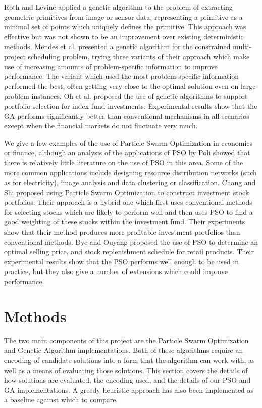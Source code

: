 \documentclass{sig-alternate}
\begin{document}
Roth and Levine applied a genetic algorithm to the problem of extracting geometric primitives from image or sensor data\cite{Roth1994}, representing a primitive as a minimal set of points which uniquely defines the primitive. This approach was effective but was not shown to be an improvement over existing deterministic methods.
Mendes et al. presented a genetic algorithm for the constrained multi-project scheduling problem, trying three variants of their approach which make use of increasing amounts of problem-specific information to improve performance\cite{Mendes2008}. The variant which used the most problem-specific information performed the best, often getting very close to the optimal solution even on large problem instances.
Oh et al. proposed the use of genetic algorithms to support portfolio selection for index fund investments\cite{Oh2005}. Experimental results show that the GA performs significantly better than conventional mechanisms in all scenarios except when the financial markets do not fluctuate very much.

We give a few examples of the use of Particle Swarm Optimization in economics or finance, although an analysis of the applications of PSO by Poli showed that there is relatively little literature on the use of PSO in this area\cite{Poli2008}. Some of the more common applications include designing resource distribution networks (such as for electricity), image analysis and data clustering or classification.
Chang and Shi proposed using Particle Swarm Optimization to construct investment stock portfolios\cite{Chang2011}. Their approach is a hybrid one which first uses conventional methods for selecting stocks which are likely to perform well and then uses PSO to find a good weighting of these stocks within the investment fund. Their experiments show that their method produces more profitable investment portfolios than conventional methods.
Dye and Ouyang proposed the use of PSO to determine an optimal selling price, and stock replenishment schedule for retail products\cite{Dye2011}. Their experimental results show that the PSO performs well enough to be used in practice, but they also give a number of extensions which could improve performance.

\section{Methods}\label{sec:methods}
The two main components of this project are the Particle Swarm Optimization and Genetic Algorithm implementations. Both of these algorithms require an encoding of candidate solutions into a form that the algorithm can work with, as well as a means of evaluating those solutions. This section covers the details of how solutions are evaluated, the encoding used, and the details of our PSO and GA implementations. A greedy heuristic approach has also been implemented as a baseline against which to compare.
\end{document}
